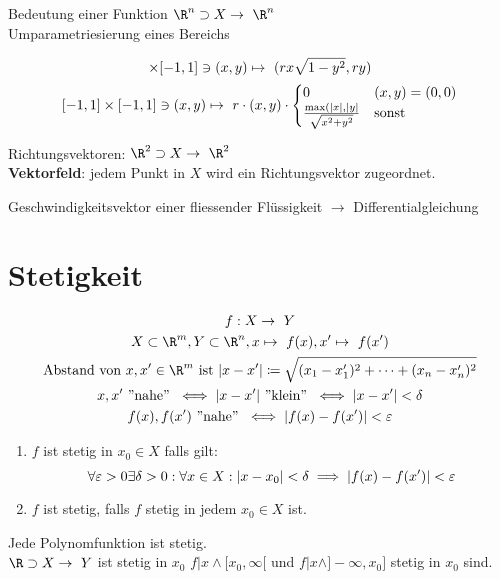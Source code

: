 Bedeutung einer Funktion $\R^n \supset X \rightarrow \R^n$\\
Umparametriesierung eines Bereichs\\
\begin{bsp*}[note = {Kreisscheibe $\subset \R^2 , x^2 + y^2 \leq r^2$}]
	\begin{gather*}
		[-1,1] \times [-1,1] \ni (x,y) \mapsto ( r x \sqrt{1-y^2} , r y )\\
		[-1,1] \times [-1,1] \ni (x,y) \mapsto r \cdot (x,y) \cdot \begin{cases}
			0									&(x,y) = (0,0)	\\
			\frac{\max( \abs{x} , \abs{y}}{\sqrt{x^2 + y^2}}	&\text{sonst}			
		\end{cases}
	\end{gather*}
\end{bsp*}
\begin{bsp*}[note = linearer Koordinatenwechsel]
\end{bsp*}

Richtungsvektoren:
$\R^2 \supset X \rightarrow \R^2$\\
\textbf{Vektorfeld}: jedem Punkt in $X$ wird ein Richtungsvektor zugeordnet.\\
\begin{bsp*}
	Geschwindigkeitsvektor einer fliessender Flüssigkeit $\rightarrow$ Differentialgleichung
\end{bsp*}

\section{Stetigkeit}
\begin{gather*}
	f: X \rightarrow Y \\
	X \subset \R^m , Y \subset \R^n , x \mapsto f(x) , x' \mapsto f(x')\\
	\text{Abstand von } x, x' \in \R ^m \text{ ist } \abs{x-x'} \coloneqq \sqrt{(x_1 - x'_1)^2 + \dots + (x_n - x'_n)^2} \\
	x, x' \text{ ''nahe'' } \iff \abs{x-x'} \text{ ''klein'' } \iff \abs{x-x'} < \delta \\
	f(x), f(x') \text{ ''nahe'' } \iff \abs{f(x) - f(x')} < \epsilon
\end{gather*}
\begin{def*}[note = Stetigkeit , index = Stetigkeit]
	\begin{enumerate}[label=(\alph*)]
		\item $f$ ist stetig in $x_0 \in X$ falls gilt:
			\[ \forall \epsilon > 0 \exists \delta > 0 : \forall x \in X : \abs{x-x_0} < \delta \implies \abs{f(x) - f(x')} < \epsilon \]
		\item $f$ ist stetig, falls $f$ stetig in jedem $x_0 \in X$ ist.
	\end{enumerate}
\end{def*}
\begin{fakt}
	Jede Polynomfunktion ist stetig. \\
	$\R \supset X \rightarrow Y$ ist stetig in $x_0$ \gdw $f|x \wedge [x_0,\infty[$ und $f|x \wedge ]-\infty,x_0]$ stetig in $x_0$ sind.
\end{fakt}

